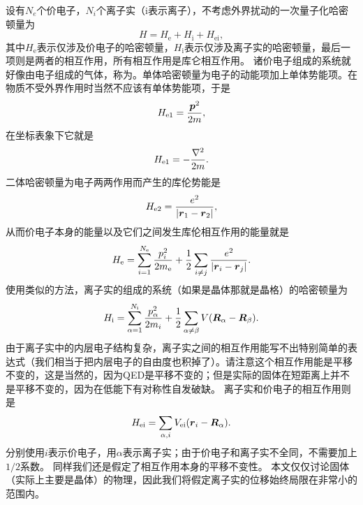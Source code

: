 设有$N_e$个价电子，$N_i$个离子实（i表示离子），不考虑外界扰动的一次量子化哈密顿量为
\begin{equation}
    {H} = {H}_\text{e} + {H}_\text{i} + {H}_\text{ei},
    \label{eq:many-body-hamiltonian}
\end{equation}
其中${H}_\text{e}$表示仅涉及价电子的哈密顿量，${H}_\text{i}$表示仅涉及离子实的哈密顿量，最后一项则是两者的相互作用，所有相互作用是库仑相互作用。
诸价电子组成的系统就好像由电子组成的气体，称为。单体哈密顿量为电子的动能项加上单体势能项。在物质不受外界作用时当然不应该有单体势能项，于是
\[
    {H}_\text{e1} = \frac{{\vb*{p}}^2}{2m},
\]
在坐标表象下它就是
\[
    {H}_\text{e1} = - \frac{\laplacian}{2m}.
\]
二体哈密顿量为电子两两作用而产生的库伦势能是
\[
    {H}_\text{e2} = \frac{e^2}{\abs{\vb*{r}_1 - \vb*{r}_2}},
\]
从而价电子本身的能量以及它们之间发生库伦相互作用的能量就是
\begin{equation}
    {H}_\text{e} = \sum_{i=1}^{N_\text{e}} \frac{{p}_i^2}{2m_\text{e}} + \frac{1}{2} \sum_{i\neq j} \frac{e^2}{\abs{\vb*{r}_i - \vb*{r}_j}}.
\end{equation}
使用类似的方法，离子实的组成的系统（如果是晶体那就是晶格）的哈密顿量为
\begin{equation}
    {H}_\text{i} = \sum_{\alpha=1}^{N_\text{i}} \frac{{p}_\alpha^2}{2m_i} + \frac{1}{2} \sum_{\alpha\neq\beta} V(\vb*{R}_\alpha-\vb*{R}_\beta).
\end{equation}
由于离子实中的内层电子结构复杂，离子实之间的相互作用能写不出特别简单的表达式（我们相当于把内层电子的自由度也积掉了）。请注意这个相互作用能是平移不变的，这是当然的，因为QED是平移不变的；但是实际的固体在短距离上并不是平移不变的，因为在低能下有对称性自发破缺。
离子实和价电子的相互作用则是
\begin{equation}
    {H}_\text{ei} = \sum_{\alpha, i} V_\text{ei}(\vb*{r}_i-\vb*{R}_\alpha). 
\end{equation}
分别使用$i$表示价电子，用$\alpha$表示离子实；由于价电子和离子实不全同，不需要加上$1/2$系数。
同样我们还是假定了相互作用本身的平移不变性。
本文仅仅讨论固体（实际上主要是晶体）的物理，因此我们将假定离子实的位移始终局限在非常小的范围内。

